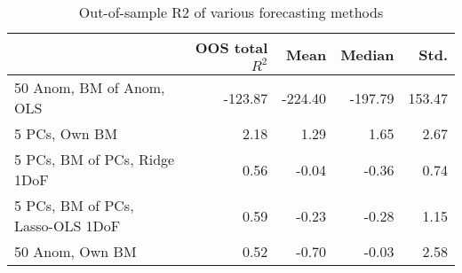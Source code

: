 \begin{table}
\caption{Out-of-sample R2 of various forecasting methods}
\begin{tabular}{lrrrr}
\toprule
 & OOS total $R^2$ & Mean & Median & Std. \\
\midrule
50 Anom, BM of Anom, OLS & -123.87 & -224.40 & -197.79 & 153.47 \\
5 PCs, Own BM & 2.18 & 1.29 & 1.65 & 2.67 \\
5 PCs, BM of PCs, Ridge 1DoF & 0.56 & -0.04 & -0.36 & 0.74 \\
5 PCs, BM of PCs, Lasso-OLS 1DoF & 0.59 & -0.23 & -0.28 & 1.15 \\
50 Anom, Own BM & 0.52 & -0.70 & -0.03 & 2.58 \\
\bottomrule
\end{tabular}
\end{table}
